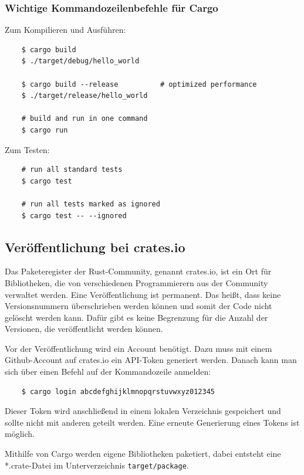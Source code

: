 \subsubsection{Wichtige Kommandozeilenbefehle für Cargo}

Zum Kompilieren und Ausführen:

\begin{lstlisting}
    $ cargo build
    $ ./target/debug/hello_world

    $ cargo build --release          # optimized performance
    $ ./target/release/hello_world

    # build and run in one command
    $ cargo run
\end{lstlisting}

\noindent Zum Testen:

\begin{lstlisting}
    # run all standard tests
    $ cargo test

    # run all tests marked as ignored
    $ cargo test -- --ignored
\end{lstlisting}

\subsection{Veröffentlichung bei crates.io}

Das Paketeregister der Rust-Community, genannt crates.io, ist ein Ort für Bibliotheken, die von verschiedenen Programmierern aus der Community verwaltet werden. Eine Veröffentlichung ist permanent. Das heißt, dass keine Versionsnummern überschrieben werden können und somit der Code nicht gelöscht werden kann. Dafür gibt es keine Begrenzung für die Anzahl der Versionen, die veröffentlicht werden können.

Vor der Veröffentlichung wird ein Account benötigt. Dazu muss mit einem Github-Account auf crates.io ein API-Token generiert werden. Danach kann man sich über einen Befehl auf der Kommandozeile anmelden:

\begin{lstlisting}
    $ cargo login abcdefghijklmnopqrstuvwxyz012345
\end{lstlisting}

Dieser Token wird anschließend in einem lokalen Verzeichnis gespeichert und sollte nicht mit anderen geteilt werden. Eine erneute Generierung eines Tokens ist möglich.

Mithilfe von Cargo werden eigene Bibliotheken paketiert, dabei entsteht eine *.crate-Datei im Unterverzeichnis \verb"target/package".

